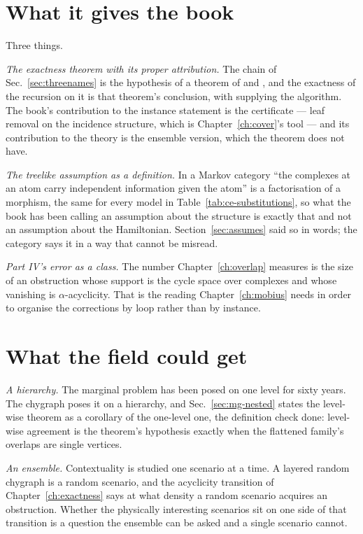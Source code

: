 \section{What it gives the book}
\label{sec:mg-gives}

Three things.

\emph{The exactness theorem with its proper attribution.} The chain of
Sec.~\ref{sec:threenames} is the hypothesis of a theorem of
\citet{vorobev1962} and \citet{kellerer1964}, and the exactness of the
recursion on it is that theorem's conclusion, with \citet{lauritzen1988}
supplying the algorithm. The book's contribution to the instance statement
is the certificate --- leaf removal on the incidence structure, which is
Chapter~\ref{ch:cover}'s tool --- and its contribution to the theory is the
ensemble version, which the theorem does not have.

\emph{The treelike assumption as a definition.} In a Markov category
``the complexes at an atom carry independent information given the atom''
is a factorisation of a morphism, the same for every model in
Table~\ref{tab:ce-substitutions}, so what the book has been calling an
assumption about the structure is exactly that and not an assumption about
the Hamiltonian. Section~\ref{sec:assumes} said so in words; the category
says it in a way that cannot be misread.

\emph{Part IV's error as a class.} The number Chapter~\ref{ch:overlap}
measures is the size of an obstruction whose support is the cycle space
over complexes and whose vanishing is $\alpha$-acyclicity. That is the
reading Chapter~\ref{ch:mobius} needs in order to organise the corrections
by loop rather than by instance.

\section{What the field could get}
\label{sec:mg-field}

\emph{A hierarchy.} The marginal problem has been posed on one level for
sixty years. The chygraph poses it on a hierarchy, and
Sec.~\ref{sec:mg-nested} states the level-wise theorem as a corollary of
the one-level one, the definition check done: level-wise agreement is the
theorem's hypothesis exactly when the flattened family's overlaps are
single vertices.

\emph{An ensemble.} Contextuality is studied one scenario at a time. A
layered random chygraph is a random scenario, and the acyclicity transition
of Chapter~\ref{ch:exactness} says at what density a random scenario
acquires an obstruction. Whether the physically interesting scenarios sit
on one side of that transition is a question the ensemble can be asked and
a single scenario cannot.


